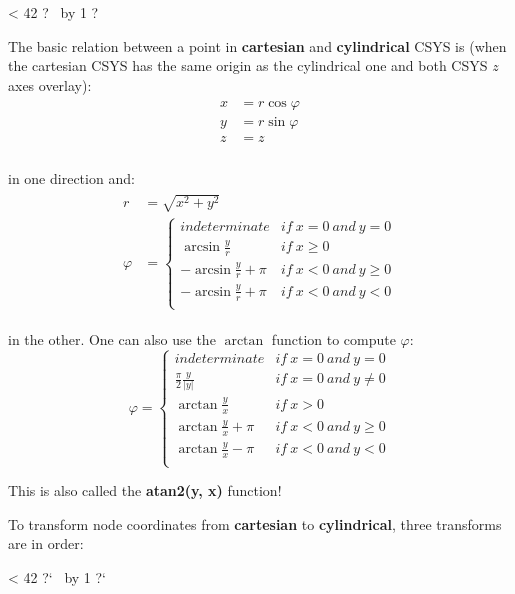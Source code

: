 \documentclass[10pt,b5paper,titlepage]{book}
\newcommand{\repeatit}[3][10]{%
    \myloopcounter1%
    \loop\ifnum\myloopcounter < #1
    #2#3%
    \advance\myloopcounter by 1%
    \repeat%
    #2%
}
\newenvironment{qbox}
{
\begin{center}
    \repeatit[42]{?}{\ }
\end{center}
}
{
\begin{center}
    \repeatit[42]{?`}{\ }
\end{center}
}
\newenvironment{eqarray}
{
    \begin{eqnarray}
        \begin{aligned}
}
{
        \end{aligned}
    \end{eqnarray}
}
\begin{document}
\begin{qbox}
    The basic relation between a point in \textbf{cartesian} and \textbf{cylindrical}
    CSYS is (when the cartesian CSYS has the same origin as the cylindrical one
    and both CSYS $ z $ axes overlay):
    \begin{eqarray}
        x &= r \cos \varphi \\
        y &= r \sin \varphi \\
        z &= z \\
    \end{eqarray}

     in one direction and:
     \begin{eqarray}
         r &= \sqrt{x^2 + y^2} \\
         \varphi &= \left\{ \begin{array}{cc}
                    indeterminate & if\ x = 0\ and\ y = 0 \\
                    \arcsin \frac{y}{r} & if\ x \ge 0 \\
                    -\arcsin \frac{y}{r} + \pi & if\ x < 0\ and\ y \ge 0 \\
                    -\arcsin \frac{y}{r} + \pi & if\ x < 0\ and\ y < 0 \\
                 \end{array} \right.
     \end{eqarray}

     in the other. One can also use the $ \arctan $ function to compute $ \varphi $:
     \begin{equation}
         \varphi = \left\{ \begin{array}{cc}
                 indeterminate & if\ x = 0\ and\ y = 0 \\
                 \frac{\pi}{2}\frac{y}{|y|} & if\ x = 0\ and\ y \ne 0 \\
                 \arctan \frac{y}{x} & if\ x > 0 \\
                 \arctan \frac{y}{x} + \pi & if\ x < 0\ and\ y \ge 0 \\
                 \arctan \frac{y}{x} - \pi & if\ x < 0\ and\ y < 0 \\
             \end{array} \right.
     \end{equation}

     This is also called the \textbf{atan2(y, x)} function!

     To transform node coordinates from \textbf{cartesian} to \textbf{cylindrical},
     three transforms are in order:


\end{qbox}
\end{document}
